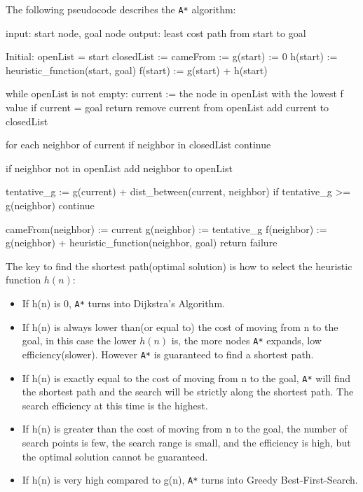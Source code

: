 The following pseudocode describes the \texttt{A*} algorithm\cite{wiki_A}:
\begin{algorithmHu}[caption={A* pseudocode}, label={alg1}]
 input: start node, goal node
 output: least cost path from start to goal
 
 Initial:
        openList = {start}
        closedList := {}
        cameFrom := {}
        g(start) := 0
        h(start) := heuristic_function(start, goal)
        f(start) := g(start) + h(start)
        
 while openList is not empty:
        current := the node in openList with the lowest f value  
        if current = goal
           return
        remove current from openList
        add current to closedList
        
        for each neighbor of current
             if neighbor in closedList
                continue
             
             if neighbor not in openList
                add neighbor to openList
                
             tentative_g := g(current) + dist_between(current, neighbor)    
             if tentative_g >= g(neighbor)
                continue   
                    
             cameFrom(neighbor) := current
             g(neighbor) := tentative_g 
             f(neighbor) := g(neighbor) + heuristic_function(neighbor, goal)
 return failure  
        
\end{algorithmHu}

The key to find the shortest path(optimal solution) is how to select the heuristic function $h(n)$\cite{AHeuristic}: 
\begin{itemize}
\item If h(n) is 0, \texttt{A*} turns into Dijkstra's Algorithm.
\item If h(n) is always lower than(or equal to) the cost of moving from n to the goal, in this case the lower $h(n)$ is, the more nodes \texttt{A*} expands, low efficiency(slower). However \texttt{A*} is guaranteed to find a shortest path.
\item If h(n) is exactly equal to the cost of moving from n to the goal, \texttt{A*} will find the shortest path and the search will be strictly along the shortest path. The search efficiency at this time is the highest.
\item If h(n) is greater than the cost of moving from n to the goal, the number of search points is few, the search range is small, and the efficiency is high, but the optimal solution cannot be guaranteed.
\item If h(n) is very high compared to g(n), \texttt{A*} turns into Greedy Best-First-Search.
\end{itemize}

